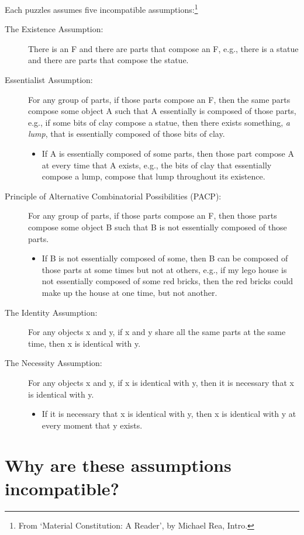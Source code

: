\documentclass[9pt]{article}
\begin{document}
Each puzzles assumes five incompatible assumptions:\footnote{From `Material  Constitution: A  Reader',  by Michael Rea, Intro.}
\begin{description}
\item [The Existence Assumption:] There is an F and there are parts that compose an F, e.g., there is a statue and there are parts that compose the statue. 
\item [Essentialist Assumption:] For any group of parts, if those parts compose an F, then the same parts compose some object A such that A essentially is composed of those parts, e.g., if some bits of clay compose a statue, then there exists something, \emph{a lump}, that is essentially composed of those bits of clay. 
\begin{itemize}
\item If A is essentially composed of some parts, then those part compose A at every time that A exists, e.g., the bits of clay that essentially compose a lump, compose that lump throughout its existence. 
\end{itemize}
\item [Principle of Alternative Combinatorial Possibilities (PACP):] For any group of parts, if those parts compose an F, then those parts compose some object B such that  B is not essentially composed of those parts.
\begin{itemize}
\item If B is not essentially composed of some, then B can be composed of  those parts at some times but not at others, e.g., if my lego house is not essentially composed of some red bricks, then the red bricks could make up the house at one time, but not another. 
\end{itemize}
\item [The Identity Assumption:] For any objects x  and y, if x and y  share all the same parts at the same time, then x is identical with y. 

\item[The Necessity Assumption:] For any objects x  and y, if x is identical with y, then it is necessary that x is identical with y.
\begin{itemize}
\item If it is necessary that x is identical with y, then x is identical with y at every moment that y exists. 
\end{itemize}
\end{description}

\section{Why are these assumptions incompatible?} 
\end{document}
